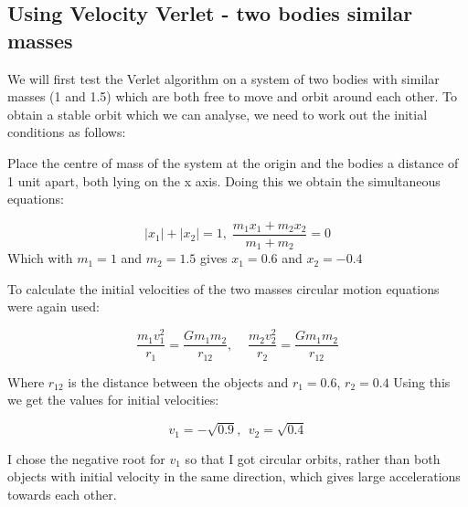 \documentclass[11pt]{article}
\begin{document}
\subsection{Using Velocity Verlet - two bodies similar masses}

We will first test the Verlet algorithm on a system of two bodies with similar masses (1 and 1.5) which are both free to move and orbit around each other. To obtain a stable orbit which we can analyse, we need to work out the initial conditions as follows:

\smallskip

Place the centre of mass of the system at the origin and the bodies a distance of 1 unit apart, both lying on the x axis. Doing this we obtain the simultaneous equations:

$$ |x_1| + |x_2| = 1, \; \frac{m_1 x_1 + m_2 x_2}{m_1 + m_2} = 0 $$
Which with $m_1 = 1$ and $m_2 = 1.5$ gives $x_1 = 0.6$ and $x_2 = -0.4$

\smallskip

To calculate the initial velocities of the two masses circular motion equations were again used:

$$ \frac{m_1 v_1^2}{r_1} = \frac{G m_1 m_2}{r_{12}} , \; \;  \; \;  \frac{m_2 v_2^2}{r_2} = \frac{G m_1 m_2}{r_{12}}$$

Where $r_{12}$ is the distance between the objects and $r_1 = 0.6$, $r_2 = 0.4$ Using this we get the values for initial velocities:

$$ v_1 = -\sqrt{0.9},\,  \;v_2 = \sqrt{0.4}$$

I chose the negative root for $v_1$ so that I got circular orbits, rather than both objects with initial velocity in the same direction, which gives large accelerations towards each other.
\end{document}
